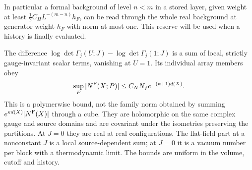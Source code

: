 \documentclass[11pt,letterpaper,reqno]{amsart}
\makeatletter
\theoremstyle{definition}
\newcommand{\ms@minorstart}{%
  \pushQED{\qed}\renewcommand{\qedsymbol}{$\blacksquare$}}
\newenvironment{proposition}[1][]{\ms@minorstart\ms@proposition[#1]}
  {\popQED\endms@proposition}
\theoremstyle{remark}
\makeatother
\begin{document}
In particular a formal background of level $n<m$ in a
stored layer, given weight at least
$\frac12C_HL^{-(m-n)}h_F$, can be read through the
whole real background at generator weight $h_F$ with
norm at most one.  This reserve will be used when a
history is finally evaluated.

\begin{proposition}[Closed-walk expansion]\label{C-397-42}
The difference $\log\det\Gamma_j(U;J)-\log\det\Gamma_j(1;J)$
is a sum of local, strictly gauge-invariant scalar terms, vanishing
at $U=1$. Its individual array members obey
\[
 \sup_P|N^{\rm F}(X;P)|\le C_NN_f e^{-(\kappa+1)d(X)}.
\]
This is a polymerwise bound, not the family norm obtained
by summing $e^{\kappa d(X)}|N^{\rm F}(X)|$ through a cube.
They are holomorphic on the same
complex gauge and source domains and are covariant under the
isometries preserving the partitions. At $J=0$ they are real at
real configurations. The flat-field part at a nonconstant $J$ is
a local source-dependent sum; at $J=0$ it is a vacuum number per
block with a thermodynamic limit. The bounds are uniform in the
volume, cutoff and history.
\end{proposition}
\end{document}
